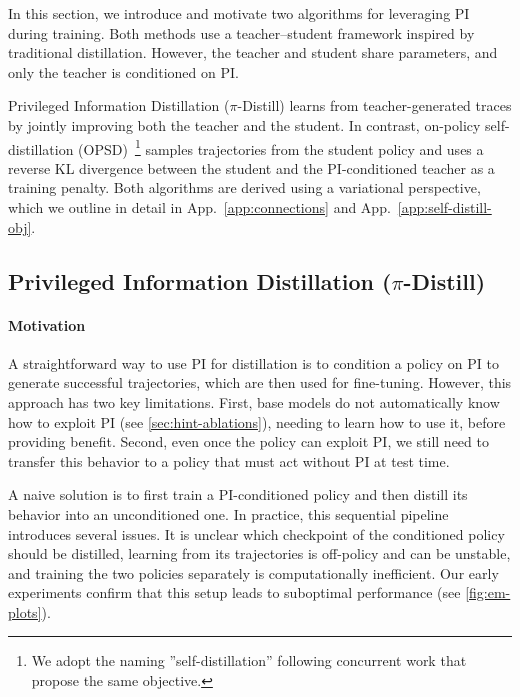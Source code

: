 \documentclass[]{servicenow} %
\begin{document}
\label{sec:pi-distill}
In this section, we introduce and motivate two algorithms for leveraging PI during training. Both methods use a teacher–student framework inspired by traditional distillation. However, the teacher and student share parameters, and only the teacher is conditioned on PI.

Privileged Information Distillation ($\pi$-Distill) learns from teacher-generated traces by jointly improving both the teacher and the student. In contrast, on-policy self-distillation (OPSD)~\footnote{We adopt the naming ''self-distillation'' following concurrent work \citep{shenfeld2026selfdistillationenablescontinuallearning,zhao2026selfdistilledreasoneronpolicyselfdistillation,hubotter2026reinforcementlearningselfdistillation} that propose the same objective. } samples trajectories from the student policy and uses a reverse KL divergence between the student and the PI-conditioned teacher as a training penalty. Both algorithms are derived using a variational perspective, which we outline in detail in App.~\ref{app:connections} and App.~\ref{app:self-distill-obj}.

\newpage
\subsection{Privileged Information Distillation ($\pi$-Distill)}

\paragraph{Motivation}
A straightforward way to use PI for distillation is to condition a policy on PI to generate successful trajectories, which are then used for fine-tuning. However, this approach has two key limitations. First, base models do not automatically know how to exploit PI (see \cref{sec:hint-ablations}), needing to learn how to use it, before providing benefit. Second, even once the policy can exploit PI, we still need to transfer this behavior to a policy that must act without PI at test time.

A naive solution is to first train a PI-conditioned policy and then distill its behavior into an unconditioned one. In practice, this sequential pipeline introduces several issues. It is unclear which checkpoint of the conditioned policy should be distilled, learning from its trajectories is off-policy and can be unstable, and training the two policies separately is computationally inefficient. Our early experiments confirm that this setup leads to suboptimal performance (see \cref{fig:em-plots}).
\end{document}
